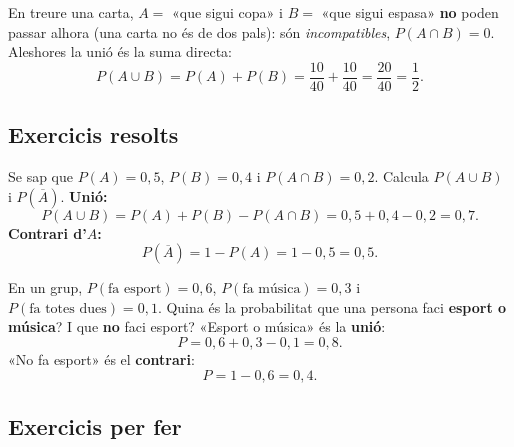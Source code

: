 \begin{exemple}
En treure una carta, $A=$ «que sigui copa» i $B=$ «que sigui espasa» \textbf{no} poden
passar alhora (una carta no és de dos pals): són \emph{incompatibles}, $P(A\cap B)=0$.
Aleshores la unió és la suma directa:
\[
P(A\cup B)=P(A)+P(B)=\frac{10}{40}+\frac{10}{40}=\frac{20}{40}=\frac{1}{2}.
\]
\end{exemple}

\subsection{Exercicis resolts}

\begin{exresolt}
Se sap que $P(A)=0,5$, $P(B)=0,4$ i $P(A\cap B)=0,2$. Calcula $P(A\cup B)$ i
$P(\overline{A})$.
\solucio
\textbf{Unió:}
\[
P(A\cup B)=P(A)+P(B)-P(A\cap B)=0,5+0,4-0,2=0,7.
\]
\textbf{Contrari d'$A$:}
\[
P(\overline{A})=1-P(A)=1-0,5=0,5.
\]
\end{exresolt}

\begin{exresolt}
En un grup, $P(\text{fa esport})=0,6$, $P(\text{fa música})=0,3$ i
$P(\text{fa totes dues})=0,1$. Quina és la probabilitat que una persona faci
\textbf{esport o música}? I que \textbf{no} faci esport?
\solucio
«Esport o música» és la \textbf{unió}:
\[
P=0,6+0,3-0,1=0,8.
\]
«No fa esport» és el \textbf{contrari}:
\[
P=1-0,6=0,4.
\]
\end{exresolt}

\subsection{Exercicis per fer}

